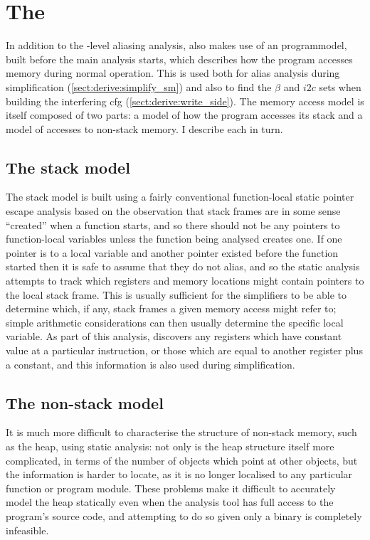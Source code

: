 \section{The }
\label{sect:program_model}

In addition to the {\StateMachine}-level aliasing analysis,
{\technique} also makes use of an \gls{programmodel}, built before the
main analysis starts, which describes how the program accesses memory
during normal operation.  This is used both for alias analysis during
{\StateMachine} simplification (\autoref{sect:derive:simplify_sm}) and
also to find the $\beta$ and $i2c$ sets when building the interfering
\gls{cfg} (\autoref{sect:derive:write_side}).  The memory access model
is itself composed of two parts: a model of how the program accesses
its stack and a model of accesses to non-stack memory.  I describe
each in turn.

\subsection{The stack model}
 The stack model is built using a fairly
conventional function-local static pointer escape analysis\needCite{}
based on the observation that stack frames are in some sense
``created'' when a function starts, and so there should not be any
pointers to function-local variables unless the function being
analysed creates one.  If one pointer is to a local variable and
another pointer existed before the function started then it is safe to
assume that they do not alias, and so the static analysis attempts to
track which registers and memory locations might contain pointers to
the local stack frame.  This is usually sufficient for the
{\StateMachine} simplifiers to be able to determine which, if any,
stack frames a given memory access might refer to; simple arithmetic
considerations can then usually determine the specific local variable.
As part of this analysis, {\technique} discovers any registers which
have constant value at a particular instruction, or those which are
equal to another register plus a constant, and this information is
also used during {\StateMachine} simplification.

\subsection{The non-stack model}
  It is much more difficult to
characterise the structure of non-stack memory, such as the heap,
using static analysis: not only is the heap structure itself more
complicated, in terms of the number of objects which point at other
objects, but the information is harder to locate, as it is no longer
localised to any particular function or program module.  These
problems make it difficult to accurately model the heap statically
even when the analysis tool has full access to the program's source
code\needCite{}, and attempting to do so given only a binary is
completely infeasible.


